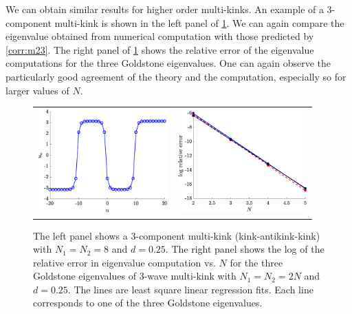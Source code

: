 \documentclass[12pt,reqno]{amsart}
\begin{document}
We can obtain similar results for higher order multi-kinks. An example of a 3-component multi-kink is shown in the left panel of \cref{fig:3p}. We can again compare the eigenvalue obtained from numerical computation with those predicted by \cref{corr:m23}. The right panel of \cref{fig:3p} shows the relative error of the eigenvalue computations for the three Goldstone eigenvalues.
One can again observe the particularly good agreement
of the theory and the computation, especially so for
larger values of $N$.

\begin{figure}[H]
	\begin{center}
	\begin{tabular}{cc}
	\includegraphics[width=5cm]{3kink.eps} &
	\includegraphics[width=5cm]{goldstone3prelerror.eps}
	\end{tabular}
	\end{center}
	\caption{The left panel shows a 3-component multi-kink (kink-antikink-kink) with $N_1 = N_2 = 8$ and $d = 0.25$. 
	The right panel shows the log of the relative error in eigenvalue computation vs. $N$ for the three Goldstone eigenvalues of 3-wave multi-kink with $N_1 = N_2 = 2N$ and $d = 0.25$. The lines are least square linear regression fits. Each line corresponds to one of the three Goldstone eigenvalues.} 
	\label{fig:3p}
\end{figure}
\end{document}
